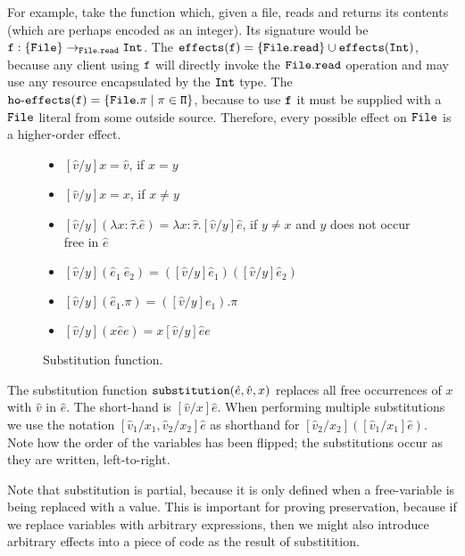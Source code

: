 For example, take the function which, given a file, reads and returns its contents (which are perhaps encoded as an integer). Its signature would be $\mathtt{f : \{ File \} \rightarrow_{File.read} Int}$. The $\mathtt{\mathtt{effects}(f) = \{File.read\} \cup \mathtt{effects}(Int)}$, because any client using $\mathtt{f}$ will directly invoke the $\mathtt{File.read}$ operation and may use any resource encapsulated by the $\mathtt{Int}$ type. The $\mathtt{\mathtt{ho \hbox{-} effects}(f) = \{ File.\pi \mid \pi \in \Pi \} }$, because to use $\mathtt{f}$ it must be supplied with a $\mathtt{File}$ literal from some outside source. Therefore, every possible effect on $\mathtt{File}$ is a higher-order effect.\\


\begin{figure}[h]


\begin{itemize}
	\setlength\itemsep{-0.7em}
	\item[] $[\hat v/y]x = \hat v$, if $x = y$
	\item[] $[\hat v/y]x = x$, if $x \neq y$
	\item[] $[\hat v/y](\lambda x: \hat \tau. \hat e) = \lambda x: \hat \tau.[\hat v/y]\hat e$, if $y \neq x$ and $y$ does not occur free in $\hat e$
	\item[] $[\hat v/y](\hat e_1~\hat e_2) = ([\hat v/y]\hat e_1)([\hat v/y]\hat e_2)$
	\item[] $[\hat v/y](\hat e_1.\pi) = ([\hat v/y]e_1).\pi$
	\item[] $[\hat v/y]({x}{\hat e}{e}) = {x}{[\hat v/y]\hat e}{e}$
\end{itemize}

\vspace{-7pt}
\caption{Substitution function.}
\label{This is the label.}
\end{figure}

\noindent
The substitution function $\mathtt{substitution}(\hat e, \hat v, x)$ replaces all free occurrences of $x$ with $\hat v$ in $\hat e$. The short-hand is $[\hat v/x]\hat e$. When performing multiple substitutions we use the notation $[\hat v_1/x_1, \hat v_2/x_2]\hat e$ as shorthand for $[\hat v_2/x_2]([\hat v_1/x_1]\hat e)$. Note how the order of the variables has been flipped; the substitutions occur as they are written, left-to-right.

Note that substitution is partial, because it is only defined when a free-variable is being replaced with a value. This is important for proving preservation, because if we replace variables with arbitrary expressions, then we might also introduce arbitrary effects into a piece of code as the result of substitition.

